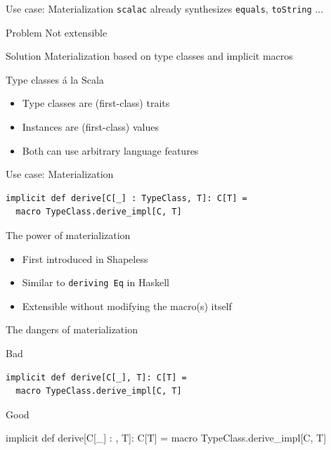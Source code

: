 \documentclass{beamer}
\newcommand\demoslide{
  {
    \setbeamertemplate{background}{}
    \begin{frame}[plain]
      \begin{center}\Large\bfseries Demo\end{center}
    \end{frame}
  }
}
\begin{document}
\begin{frame}{Use case: Materialization}
  \texttt{scalac} already synthesizes \texttt{equals}, \texttt{toString} ...

  \vspace{1em}
  \begin{alertblock}{Problem}
    Not extensible
  \end{alertblock}

  \vspace{1em}
  \begin{exampleblock}{Solution}
    Materialization based on type classes and implicit macros
  \end{exampleblock}
\end{frame}

\begin{frame}{Type classes \'a la Scala}
  \begin{itemize}
    \item Type classes are (first-class) traits
    \item Instances are (first-class) values
    \item<visible@2> Both can use arbitrary language features
  \end{itemize}
\end{frame}

\begin{frame}[fragile]{Use case: Materialization}
  \begin{verbatim}
implicit def derive[C[_] : TypeClass, T]: C[T] =
  macro TypeClass.derive_impl[C, T]
  \end{verbatim}
\end{frame}


\begin{frame}{The power of materialization}
  \begin{itemize}
    \item First introduced in Shapeless
    \item Similar to \texttt{deriving Eq} in Haskell
    \item Extensible without modifying the macro(s) itself
  \end{itemize}
\end{frame}

\begin{frame}[fragile]{The dangers of materialization}
  \vspace{1em}
  \begin{alertblock}{Bad}
  \begin{verbatim}
implicit def derive[C[_], T]: C[T] =
  macro TypeClass.derive_impl[C, T]
  \end{verbatim}
  \end{alertblock}

  \vspace{1em}
  \begin{exampleblock}{Good}
  \begin{semiverbatim}
implicit def derive[C[_] : \text{\color{blue}{TypeClass}}, T]: C[T] =
  macro TypeClass.derive_impl[C, T]
  \end{semiverbatim}
  \end{exampleblock}
\end{frame}
\end{document}
